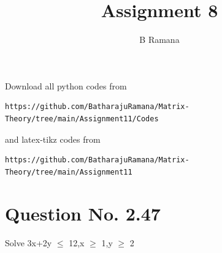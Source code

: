 \documentclass[journal,12pt,twocolumn]{IEEEtran}
\begin{document}
     \def\rightbox#1{\makebox[0in][r]{#1}}
     \def\centbox#1{\makebox[0in]{#1}}
     \def\topbox#1{\raisebox{-\baselineskip}[0in][0in]{#1}}
     \def\midbox#1{\raisebox{-0.5\baselineskip}[0in][0in]{#1}}
\vspace{3cm}
\title{Assignment 8}
\author{B Ramana }
\maketitle
\newpage
\bigskip
\renewcommand{\thefigure}{\theenumi}
\renewcommand{\thetable}{\theenumi}
Download all python codes from 
\begin{lstlisting}
https://github.com/BatharajuRamana/Matrix-Theory/tree/main/Assignment11/Codes
\end{lstlisting}
%
and latex-tikz codes from 
%
\begin{lstlisting}
https://github.com/BatharajuRamana/Matrix-Theory/tree/main/Assignment11
\end{lstlisting}
%
\section{Question No. 2.47}
Solve 3x+2y $\leq$ 12,x $\geq$ 1,y $\geq$ 2
\end{document}
